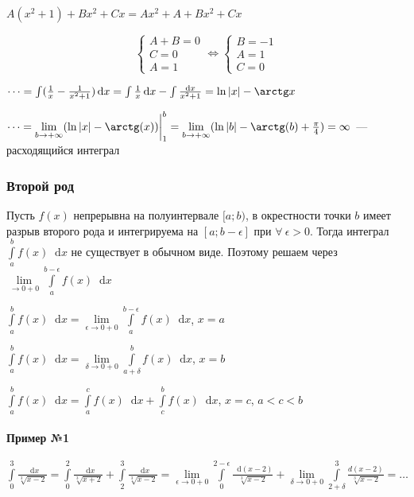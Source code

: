 \documentclass{article}
\newcommand*\diff{\mathop{}\!\mathrm{d}}
\begin{document}
$A (x^2 + 1) + B x^2 + C x = A x^2 + A + Bx^2 + C x$

\begin{equation}
\begin{cases}
    A + B = 0 \\
    C = 0 \\
    A = 1
\end{cases} \Longleftrightarrow
\begin{cases}
    B = -1 \\
    A = 1 \\
    C = 0
\end{cases}
\end{equation}

$\dots = \int (\frac{1}{x} - \frac{1}{x^2 + 1}) \diff x = \int \frac{1}{x} \diff x - \int \frac{\diff x}{x^2 + 1} = \ln |x| - \arctg x$

$\dots = \lim\limits_{b \to +\infty} (\ln |x| - \arctg (x)) \bigg|_{1}^{b} = \lim\limits_{b \to +\infty} (\ln |b| - \arctg (b) + \frac{\pi}{4}) = \infty$ — расходящийся интеграл

\subsubsection{Второй род}

Пусть $f(x)$ непрерывна на полуинтервале $[a; b)$, в окрестности точки $b$ имеет разрыв второго рода и интегрируема на $[a; b - \epsilon]$ при $\forall \ \epsilon > 0$. Тогда интеграл $\int\limits_{a}^{b} f(x) \diff x$ не существует в обычном виде. Поэтому решаем через $\lim\limits_{\to 0 + 0} \int\limits_{a}^{b - \epsilon} f(x) \diff x$


$\int\limits_{a}^{b} f(x) \diff x = \lim\limits_{\epsilon \to 0 + 0} \int\limits_{a}^{b - \epsilon} f(x) \diff x$, $x = a$

$\int\limits_{a}^{b} f(x) \diff x = \lim\limits_{\delta \to 0 + 0} \int\limits_{a + \delta}^{b} f(x) \diff x$, $x = b$

$\int\limits_{a}^{b} f(x) \diff x = \int\limits_{a}^{c} f(x) \diff x + \int\limits_{c}^{b} f(x) \diff x$, $x = c$, $a < c < b$

\paragraph{Пример №1}

$\int\limits_{0}^{3} \frac{\diff x}{\sqrt[3]{x - 2}} = \int\limits_{0}^{2} \frac{\diff x}{\sqrt[3]{x + 2}} + \int\limits_{2}^{3} \frac{\diff x}{\sqrt[3]{x - 2}} = \lim\limits_{\epsilon \to 0 + 0} \int\limits_{0}^{2 - \epsilon} \frac{\diff (x - 2)}{\sqrt[3]{x - 2}} + \lim\limits_{\delta \to 0 + 0} \int\limits_{2 + \delta}^{3} \frac{d (x - 2)}{\sqrt[3]{x - 2}} = \dots$
\end{document}
